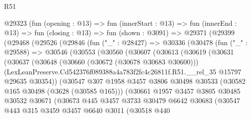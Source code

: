 \begin{lexlean}{R51}
\begin{coremodule}
      @29323
        (fun (opening : @13) =>
        fun (innerStart : @13) =>
        fun (innerEnd : @13) =>
        fun (closing : @13) =>
        fun (shown : @3091) =>
        @29371
          (@29399
            (@29468
              (@29526
                (@29846
                  (fun ("_" : @28427) =>
                  @30336
                    (@30478
                      (fun ("_" : @29588) =>
                      @30546
                        (@30553
                          (@30560
                            (@30607
                              (@30613
                                (@30619
                                  (@30631
                                    (@30637
                                      (@30648
                                        (@30660 (@30672 (@30678 @30683 @30600)))
                                        (LexLeanPreserve.Cd542376f089388a4a783f2fc4c26811f.R51.__rel_35
                                          @15797
                                          @29635
                                          @30354))
                                      (@30547
                                        @307
                                        @1958
                                        @3457
                                        @3806
                                        @30498
                                        @30533
                                        (@30582 @165 @30498 (@3628 (@30585 @165)))
                                        (@30661
                                          @1957
                                          @3457
                                          @3805
                                          @30485
                                          @30532
                                          @30671
                                          (@30673
                                            @445
                                            @3457
                                            @3733
                                            @30479
                                            @6642
                                            @30683
                                            (@30547
                                              @443
                                              @315
                                              @3459
                                              @3457
                                              @6640
                                              @3011
                                              (@30518
                                                @440

\end{coremodule}
\end{lexlean}
